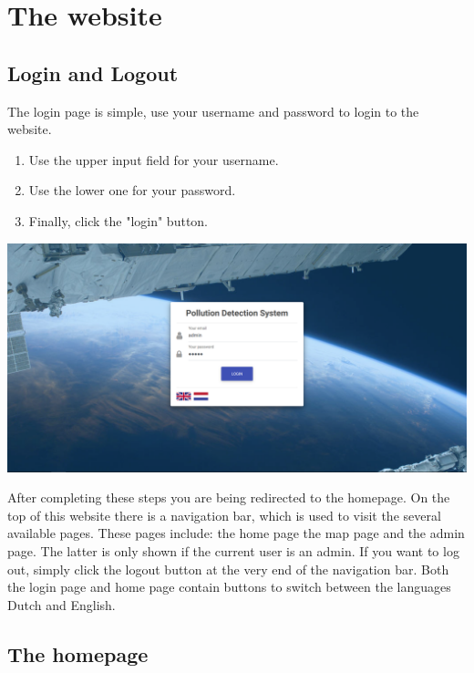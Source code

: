 \documentclass[a4paper]{article}
\begin{document}
\pagebreak

\section{The website}
\subsection{Login and Logout}
The login page is simple, use your username and password to login to the website.

\begin{enumerate}[wide, labelwidth=!, labelindent=0pt]
	\item Use the upper input field for your username.
	\item Use the lower one for your password.
	\item Finally, click the "login" button.
\end{enumerate}

\noindent
\includegraphics[width=\textwidth]{login}

\noindent
After completing these steps you are being redirected to the homepage.
\newline
On the top of this website there is a navigation bar, which is used to visit the several available pages. These pages include: the home page the map page and the admin page. The latter is only shown if the current user is an admin.
\newline
If you want to log out, simply click the logout button at the very end of the navigation bar.
\newline
Both the login page and home page contain buttons to switch between the languages Dutch and English.

\pagebreak

\subsection{The homepage}
\lipsum[1-2]
% 
% 
\end{document}
